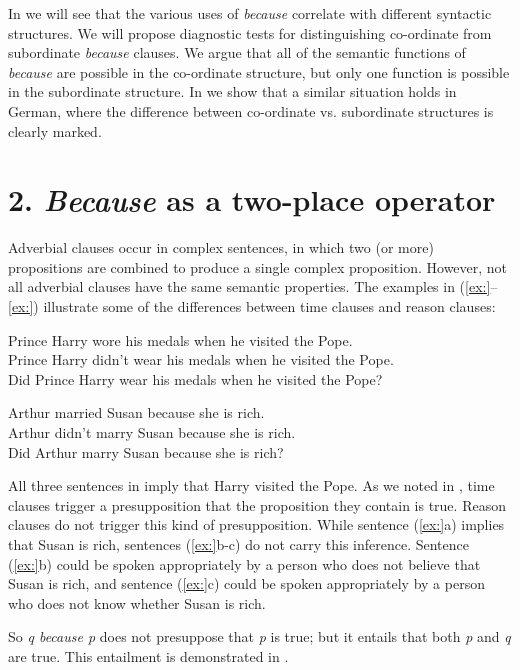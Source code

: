 In  we will see that the various uses of \textit{because} correlate with different syntactic structures. We will propose diagnostic tests for distinguishing co-ordinate from subordinate \textit{because} clauses. We argue that all of the semantic functions of \textit{because} are possible in the co-ordinate structure, but only one function is possible in the subordinate structure. In  we show that a similar situation holds in German, where the difference between co-ordinate vs. subordinate structures is clearly marked.


\section{2. \textit{Because} as a two-place operator}\label{sec:}

Adverbial clauses occur in complex sentences, in which two (or more) propositions are combined to produce a single complex proposition. However, not all adverbial clauses have the same semantic properties. The examples in (\ref{ex:}--\ref{ex:}) illustrate some of the differences between time clauses and reason clauses:


\ea
\ea Prince Harry wore his medals when he visited the Pope.\\
\ex Prince Harry didn’t wear his medals when he visited the Pope.\\
\ex Did Prince Harry wear his medals when he visited the Pope?
                       \z
\z

\ea
\ea Arthur married Susan because she is rich.\\
\ex Arthur didn’t marry Susan because she is rich.\\
\ex Did Arthur marry Susan because she is rich?
                       \z
\z


All three sentences in  imply that Harry visited the Pope. As we noted in , time clauses trigger a presupposition that the proposition they contain is true. Reason clauses do not trigger this kind of presupposition. While sentence (\ref{ex:}a) implies that Susan is rich, sentences (\ref{ex:}b-c) do not carry this inference. Sentence (\ref{ex:}b) could be spoken appropriately by a person who does not believe that Susan is rich, and sentence (\ref{ex:}c) could be spoken appropriately by a person who does not know whether Susan is rich.



So \textit{q because p} does not presuppose that \textit{p} is true; but it entails that both \textit{p} and \textit{q} are true. This entailment is demonstrated in .


